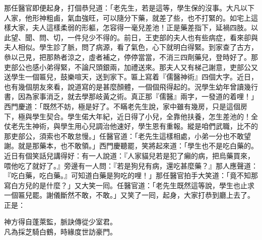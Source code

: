 那任醫官即便起身，打個恭兒道：「老先生，若是這等，學生保的沒事。大凡以下人家，他形神粗鹵，氣血強旺，可以隨分下藥，就差了些，也不打緊的。{}如宅上這樣大家，夫人這樣柔弱的形軀，怎容得一毫兒差池！正是藥差指下，延禍四肢。以此望、聞、問、切，一件兒少不得的。前日，王吏部的夫人也有些病症，看來卻與夫人相似。學生診了脈，問了病源，看了氣色，心下就明白得緊。到家查了古方，叅以己見，把那熱者涼之，虛者補之，停停當當，不消三四劑藥兒，登時好了。那吏部公也感小弟得緊，不論尺頭銀兩，加禮送來。那夫人又有梯己謝意，吏部公又送學生一個匾兒，鼓樂喧天，送到家下。匾上寫着『儒醫神術』四個大字。近日，也有幾個朋友來看，說道寫的是甚麼顏體，{}一個個飛得起的。況學生幼年曾讀幾行書，因為家事消乏，就去學那岐黃之術。真正那『儒醫』兩字，一發道的着哩！」{}西門慶道：「既然不妨，極是好了。不瞞老先生說，家中雖有幾房，只是這個房下，極與學生契合。學生偌大年紀，近日得了小兒，全靠他扶養，怎生差池的！全仗老先生神術，與學生用心兒調治他速好，學生恩有重報。縱是咱們武職，比不的那吏部公，{}須索也不敢怠慢。」任醫官道：「老先生這樣相處，小弟一分也不敢望謝。就是那藥本，也不敢領。」西門慶聽罷，笑將起來道：「學生也不是吃白藥的。近日有個笑話兒講得好：有一人說道：『人家貓兒若是犯了癩的病，把烏藥買來，喂他吃了就好了。』旁邊有一人問：『若是狗兒有病，還吃甚麼藥？』那人應聲道：『吃白藥，吃白藥。』可知道白藥是狗吃的哩！」那任醫官拍手大笑道：「竟不知那寫白方兒的是什麼？」又大笑一囘。任醫官道：「老先生既然這等說，學生也止求一個匾兒罷。謝儀斷然不敢，不敢。」又笑了一囘，起身，大家打恭到廳上去了。正是：

\begin{myquote}
神方得自蓬萊監，脈訣傳從少室君。\\凡為採芝騎白鶴，時緣度世訪豪門。
\end{myquote}

